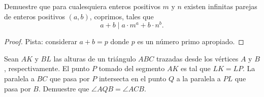 

\begin{probMG}
  Demuestre que para cualesquiera enteros positivos $m$ y $n$ existen infinitas
  parejas de enteros positivos $(a,b)$, coprimos, tales que
  \[a+b\mid a\cdot m^a+b\cdot n^b.\]
\end{probMG}

\begin{proof}
  Pista: considerar $a+b=p$ donde $p$ es un número primo apropiado.
\end{proof}


\begin{probEG}
  Sean $AK$ y $BL$ las alturas de un triángulo $ABC$ trazadas desde los vértices
  $A$ y $B$, respectivamente. El punto $P$ tomado del segmento $AK$ es tal que
  $LK=LP$. La paralela a $BC$ que pasa por $P$ intersecta en el punto $Q$ a la
  paralela a $PL$ que pasa por $B$. Demuestre que $\angle AQB=\angle ACB$.
\end{probEG}

